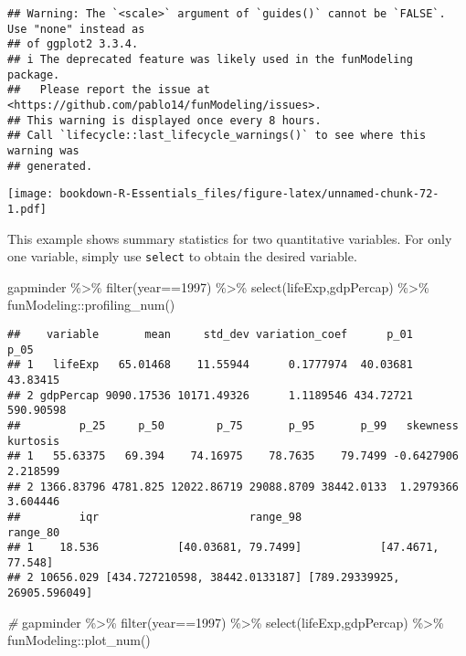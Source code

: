\documentclass[
]{book}
\newenvironment{Shaded}{\begin{snugshade}}{\end{snugshade}}
\newcommand{\CommentTok}[1]{\textcolor[rgb]{0.56,0.35,0.01}{\textit{#1}}}
\newcommand{\DecValTok}[1]{\textcolor[rgb]{0.00,0.00,0.81}{#1}}
\newcommand{\FunctionTok}[1]{\textcolor[rgb]{0.00,0.00,0.00}{#1}}
\newcommand{\NormalTok}[1]{#1}
\newcommand{\SpecialCharTok}[1]{\textcolor[rgb]{0.00,0.00,0.00}{#1}}
\begin{document}
\begin{verbatim}
## Warning: The `<scale>` argument of `guides()` cannot be `FALSE`. Use "none" instead as
## of ggplot2 3.3.4.
## i The deprecated feature was likely used in the funModeling package.
##   Please report the issue at <https://github.com/pablo14/funModeling/issues>.
## This warning is displayed once every 8 hours.
## Call `lifecycle::last_lifecycle_warnings()` to see where this warning was
## generated.
\end{verbatim}

\texttt{[image: bookdown-R-Essentials\_files/figure-latex/unnamed-chunk-72-1.pdf]}

This example shows summary statistics for two quantitative variables. For only one variable, simply use \texttt{select} to obtain the desired variable.

\begin{Shaded}
\begin{Highlighting}[]
\NormalTok{gapminder }\SpecialCharTok{\%\textgreater{}\%}
  \FunctionTok{filter}\NormalTok{(year}\SpecialCharTok{==}\DecValTok{1997}\NormalTok{) }\SpecialCharTok{\%\textgreater{}\%}
  \FunctionTok{select}\NormalTok{(lifeExp,gdpPercap) }\SpecialCharTok{\%\textgreater{}\%}
\NormalTok{funModeling}\SpecialCharTok{::}\FunctionTok{profiling\_num}\NormalTok{() }
\end{Highlighting}
\end{Shaded}

\begin{verbatim}
##    variable       mean     std_dev variation_coef      p_01      p_05
## 1   lifeExp   65.01468    11.55944      0.1777974  40.03681  43.83415
## 2 gdpPercap 9090.17536 10171.49326      1.1189546 434.72721 590.90598
##         p_25     p_50        p_75       p_95       p_99   skewness kurtosis
## 1   55.63375   69.394    74.16975    78.7635    79.7499 -0.6427906 2.218599
## 2 1366.83796 4781.825 12022.86719 29088.8709 38442.0133  1.2979366 3.604446
##         iqr                       range_98                     range_80
## 1    18.536            [40.03681, 79.7499]            [47.4671, 77.548]
## 2 10656.029 [434.727210598, 38442.0133187] [789.29339925, 26905.596049]
\end{verbatim}

\begin{Shaded}
\begin{Highlighting}[]
\CommentTok{\#}
\NormalTok{gapminder }\SpecialCharTok{\%\textgreater{}\%}
  \FunctionTok{filter}\NormalTok{(year}\SpecialCharTok{==}\DecValTok{1997}\NormalTok{) }\SpecialCharTok{\%\textgreater{}\%}
  \FunctionTok{select}\NormalTok{(lifeExp,gdpPercap) }\SpecialCharTok{\%\textgreater{}\%}
\NormalTok{funModeling}\SpecialCharTok{::}\FunctionTok{plot\_num}\NormalTok{() }
\end{Highlighting}
\end{Shaded}
\end{document}
